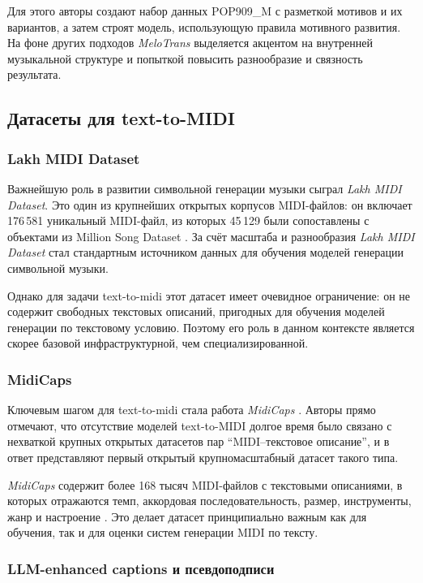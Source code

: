\documentclass[a4paper,12pt]{extarticle}
\begin{document}
Для этого авторы создают набор данных POP909\_M с разметкой мотивов и их
вариантов, а затем строят модель, использующую правила мотивного
развития. На фоне других подходов \textit{MeloTrans} выделяется акцентом
на внутренней музыкальной структуре и попыткой повысить разнообразие и
связность результата.

\subsection{Датасеты для text-to-MIDI}

\subsubsection{Lakh MIDI Dataset}

Важнейшую роль в развитии символьной генерации музыки сыграл
\textit{Lakh MIDI Dataset}. Это один из крупнейших открытых корпусов
MIDI-файлов: он включает 176\,581 уникальный MIDI-файл, из которых
45\,129 были сопоставлены с объектами из Million Song Dataset
\cite{raffel2016lmd}. За счёт масштаба и разнообразия
\textit{Lakh MIDI Dataset} стал стандартным источником данных для
обучения моделей генерации символьной музыки.

Однако для задачи text-to-midi этот датасет имеет очевидное ограничение:
он не содержит свободных текстовых описаний, пригодных для обучения
моделей генерации по текстовому условию. Поэтому его роль в данном
контексте является скорее базовой инфраструктурной, чем
специализированной.

\subsubsection{MidiCaps}

Ключевым шагом для text-to-midi стала работа \textit{MidiCaps}
\cite{melechovsky2024midicaps}. Авторы прямо отмечают, что отсутствие
моделей text-to-MIDI долгое время было связано с нехваткой крупных
открытых датасетов пар ``MIDI--текстовое описание'', и в ответ
представляют первый открытый крупномасштабный датасет такого типа.

\textit{MidiCaps} содержит более 168 тысяч MIDI-файлов с текстовыми
описаниями, в которых отражаются темп, аккордовая последовательность,
размер, инструменты, жанр и настроение \cite{melechovsky2024midicaps}.
Это делает датасет принципиально важным как для обучения, так и для
оценки систем генерации MIDI по тексту.

\subsubsection{LLM-enhanced captions и псевдоподписи}
\end{document}
